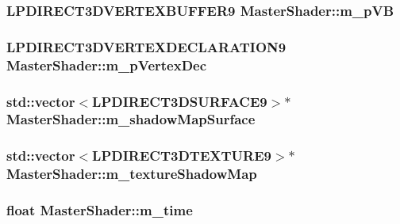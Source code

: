 \label{class_master_shader_a051e371aa066bcdf405b08f77acdcccf}
\hypertarget{class_master_shader_a5082bcc19e3842984e9adc1e7c5f4932}{
\subsubsection[{m\_\-pVB}]{\setlength{\rightskip}{0pt plus 5cm}LPDIRECT3DVERTEXBUFFER9 {\bf MasterShader::m\_\-pVB}}}
\label{class_master_shader_a5082bcc19e3842984e9adc1e7c5f4932}
\hypertarget{class_master_shader_a379013e2729350855bd95337848260b9}{
\subsubsection[{m\_\-pVertexDec}]{\setlength{\rightskip}{0pt plus 5cm}LPDIRECT3DVERTEXDECLARATION9 {\bf MasterShader::m\_\-pVertexDec}}}
\label{class_master_shader_a379013e2729350855bd95337848260b9}
\hypertarget{class_master_shader_a7e37a6ac3d2d161583c6b567b1762510}{
\subsubsection[{m\_\-shadowMapSurface}]{\setlength{\rightskip}{0pt plus 5cm}std::vector$<$LPDIRECT3DSURFACE9$>$$\ast$ {\bf MasterShader::m\_\-shadowMapSurface}}}
\label{class_master_shader_a7e37a6ac3d2d161583c6b567b1762510}
\hypertarget{class_master_shader_a56acde939cd7a8d278c9ad23b9bc8673}{
\subsubsection[{m\_\-textureShadowMap}]{\setlength{\rightskip}{0pt plus 5cm}std::vector$<$LPDIRECT3DTEXTURE9$>$$\ast$ {\bf MasterShader::m\_\-textureShadowMap}}}
\label{class_master_shader_a56acde939cd7a8d278c9ad23b9bc8673}
\hypertarget{class_master_shader_ad7431a0297a89d1505463f4b634fc4ec}{
\subsubsection[{m\_\-time}]{\setlength{\rightskip}{0pt plus 5cm}float {\bf MasterShader::m\_\-time}}}
\label{class_master_shader_ad7431a0297a89d1505463f4b634fc4ec}


